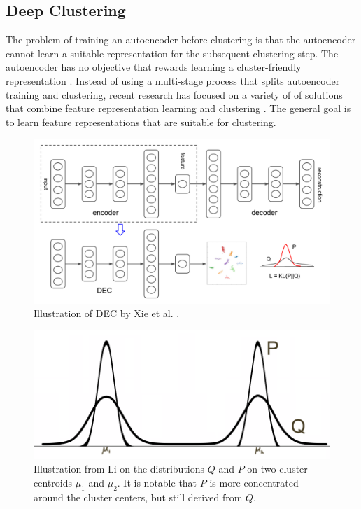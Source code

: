 \subsection{Deep Clustering}

The problem of training an autoencoder before clustering is that the autoencoder cannot learn a suitable representation for the subsequent clustering step. The autoencoder has no objective that rewards learning a cluster-friendly representation \cite{dcn}. Instead of using a multi-stage process that splits autoencoder training and clustering, recent research has focused on a variety of of solutions that combine feature representation learning and clustering \cite{deep_clustering_survey}. The general goal is to learn feature representations that are suitable for clustering.

\begin{figure}
\centering
	\includegraphics[width=1\linewidth]{dec.png}
	\caption{Illustration of DEC by Xie et al. \cite{dec}.}
	\label{dec}
\end{figure}

\begin{figure}
\centering
	\includegraphics[width=0.7\linewidth]{p-and-q-distributions.png}
	\caption{Illustration from Li \cite{comparing_DEC_and_DCN} on the distributions $Q$ and $P$ on two cluster centroids $\mu_1$ and $\mu_2$. It is notable that $P$ is more concentrated around the cluster centers, but still derived from $Q$.}
	\label{p-and-q-distributions}
\end{figure}	

